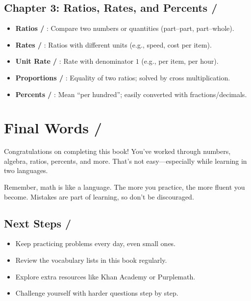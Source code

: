 \section*{Chapter 3: Ratios, Rates, and Percents / }
\begin{itemize}
  \item \textbf{Ratios / }: Compare two numbers or quantities (part–part, part–whole).  
  \item \textbf{Rates / }: Ratios with different units (e.g., speed, cost per item).  
  \item \textbf{Unit Rate / }: Rate with denominator $1$ (e.g., per item, per hour).  
  \item \textbf{Proportions / }: Equality of two ratios; solved by cross multiplication.  
  \item \textbf{Percents / }: Mean “per hundred”; easily converted with fractions/decimals.  
\end{itemize}

\cleardoublepage
\chapter{Final Words / }

Congratulations on completing this book!  
You've worked through numbers, algebra, ratios, percents, and more.  
That's not easy—especially while learning in two languages.  

\blockquote{}

Remember, math is like a language.  
The more you practice, the more fluent you become.  
Mistakes are part of learning, so don't be discouraged.  

\blockquote{}

\section*{Next Steps / }
\begin{itemize}
  \item Keep practicing problems every day, even small ones.
  \item Review the vocabulary lists in this book regularly.
  \item Explore extra resources like Khan Academy or Purplemath.
  \item Challenge yourself with harder questions step by step.
\end{itemize}

